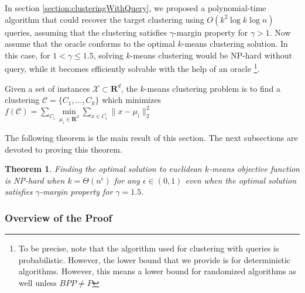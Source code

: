 \documentclass{article}
\newcommand{\mc}{\mathcal}
\newcommand{\mb}{\mathbf}
\newtheorem{theorem}{Theorem}
\begin{document}
In section \ref{section:clusteringWithQuery}, we proposed a polynomial-time algorithm that could recover the target clustering using $O(k^2\log k \log n)$ queries, assuming that the clustering satisfies $\gamma$-margin property for $\gamma>1$. Now assume that the oracle conforms to the optimal $k$-means clustering solution. In this case, for $1<\gamma\le 1.5$, solving $k$-means clustering would be NP-hard without query, while it becomes efficiently solvable with the help of an oracle \footnote{To be precise, note that the algorithm used for clustering with queries is probabilistic. However, the lower bound that we provide is for deterministic algorithms. However, this means a lower bound for randomized algorithms as well unless $BPP\neq P$}. 

Given a set of instances $\mc X \subset \mb R ^d$, the $k$-means clustering problem is to find a clustering $\mc C = \{C_1, \ldots, C_k\}$ which minimizes $f(\mc C) = \sum\limits_{C_i} \min\limits_{\mu_i\in {\mb R}^d}\sum\limits_{x\in C_i} \|x - \mu_i \|_2^2$





The following theorem is the main result of this section. The next subsections are devoted to proving this theorem.

\begin{theorem}
\label{thm:gammaLower}
Finding the optimal solution to euclidean $k$-means objective function is NP-hard when $k=\Theta(n^\epsilon)$ for any $\epsilon \in (0,1)$ even when the optimal solution satisfies $\gamma$-margin property for $\gamma = 1.5$.
\end{theorem}

\subsubsection{Overview of the Proof}
\end{document}
